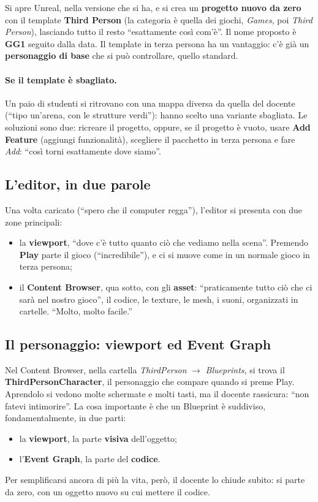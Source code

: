 Si apre Unreal, nella versione che si ha, e si crea un \textbf{progetto nuovo
da zero} con il template \textbf{Third Person} (la categoria è quella dei
giochi, \emph{Games}, poi \emph{Third Person}), lasciando tutto il resto
``esattamente così com'è''. Il nome proposto è \textbf{GG1} seguito dalla
data. Il template in terza persona ha un vantaggio: c'è già un
\textbf{personaggio di base} che si può controllare, quello standard.

\paragraph{Se il template è sbagliato.} Un paio di studenti si ritrovano con
una mappa diversa da quella del docente (``tipo un'arena, con le strutture
verdi''): hanno scelto una variante sbagliata. Le soluzioni sono due:
ricreare il progetto, oppure, se il progetto è vuoto, usare \textbf{Add
Feature} (aggiungi funzionalità), scegliere il pacchetto in terza persona e
fare \emph{Add}: ``così torni esattamente dove siamo''.

\subsection{L'editor, in due parole}

Una volta caricato (``spero che il computer regga''), l'editor si presenta con
due zone principali:
\begin{itemize}
  \item la \textbf{viewport}, ``dove c'è tutto quanto ciò che vediamo nella
        scena''. Premendo \textbf{Play} parte il gioco (``incredibile''), e
        ci si muove come in un normale gioco in terza persona;
  \item il \textbf{Content Browser}, qua sotto, con gli \textbf{asset}:
        ``praticamente tutto ciò che ci sarà nel nostro gioco'', il codice,
        le texture, le mesh, i suoni, organizzati in cartelle. ``Molto, molto
        facile.''
\end{itemize}

\subsection{Il personaggio: viewport ed Event Graph}

Nel Content Browser, nella cartella \emph{ThirdPerson} $\rightarrow$
\emph{Blueprints}, si trova il \textbf{ThirdPersonCharacter}, il personaggio
che compare quando si preme Play. Aprendolo si vedono molte schermate e molti
tasti, ma il docente rassicura: ``non fatevi intimorire''. La cosa importante
è che un Blueprint è suddiviso, fondamentalmente, in due parti:
\begin{itemize}
  \item la \textbf{viewport}, la parte \textbf{visiva} dell'oggetto;
  \item l'\textbf{Event Graph}, la parte del \textbf{codice}.
\end{itemize}
Per semplificarsi ancora di più la vita, però, il docente lo chiude subito:
si parte da zero, con un oggetto nuovo su cui mettere il codice.


